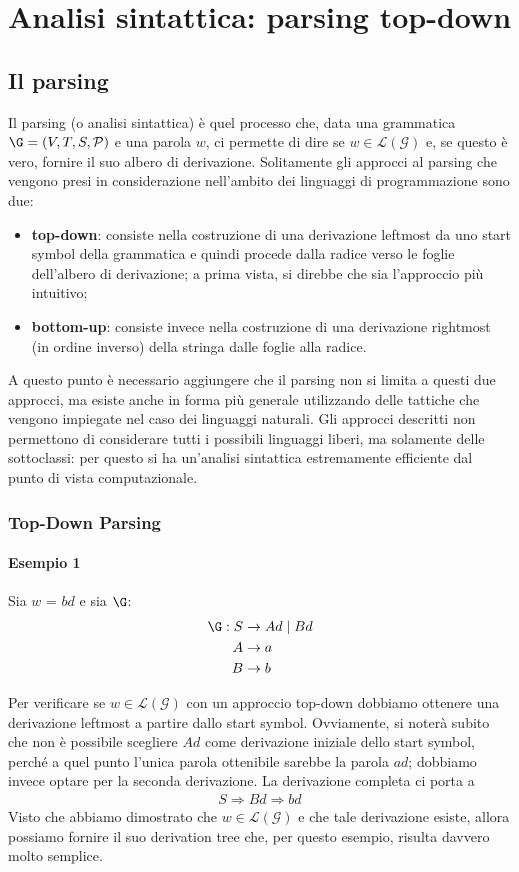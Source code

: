 \documentclass[class=book, crop=false, oneside, 12pt]{standalone}
\begin{document}
\chapter{Analisi sintattica: parsing top-down}

\section{Il parsing}
Il parsing (o analisi sintattica) è quel processo che, data una grammatica \(\G = (V, T, S, \mathcal{P})\) e una parola \(w\), ci permette di dire se \(w \in \mathcal{L(G)}\) e, se questo è vero, fornire il suo albero di derivazione. Solitamente gli approcci al parsing che vengono presi in considerazione nell'ambito dei linguaggi di programmazione sono due: 
\begin{itemize}
    \item \textbf{top-down}: consiste nella costruzione di una derivazione leftmost da uno start symbol della grammatica e quindi procede dalla radice verso le foglie dell'albero di derivazione; a prima vista, si direbbe che sia l'approccio più intuitivo;
    \item \textbf{bottom-up}: consiste invece nella costruzione di una derivazione rightmost (in ordine inverso) della stringa dalle foglie alla radice.
\end{itemize}
A questo punto è necessario aggiungere che il parsing non si limita a questi due approcci, ma esiste anche in forma più generale utilizzando delle tattiche che vengono impiegate nel caso dei linguaggi naturali. Gli approcci descritti non permettono di considerare tutti i possibili linguaggi liberi, ma solamente delle sottoclassi: per questo si ha un'analisi sintattica estremamente efficiente dal punto di vista computazionale.

\subsection{Top-Down Parsing}
\subsubsection{Esempio 1}
Sia \(w\) = \(bd\) e sia \(\G\): 
\begin{align*}
    \G: S &\rightarrow Ad \mid Bd \\
    A &\rightarrow a \\
    B &\rightarrow b
\end{align*}

Per verificare se \(w \in \mathcal{L(G)}\) con un approccio top-down dobbiamo ottenere una derivazione leftmost a partire dallo start symbol. Ovviamente, si noterà subito che non è possibile scegliere \(Ad\) come derivazione iniziale dello start symbol, perché a quel punto l'unica parola ottenibile sarebbe la parola \(ad\); dobbiamo invece optare per la seconda derivazione. La derivazione completa ci porta a
\begin{align*}
    S \Rightarrow Bd \Rightarrow bd
\end{align*}
Visto che abbiamo dimostrato che \(w \in \mathcal{L(G)}\) e che tale derivazione esiste, allora possiamo fornire il suo derivation tree che, per questo esempio, risulta davvero molto semplice.
\end{document}
